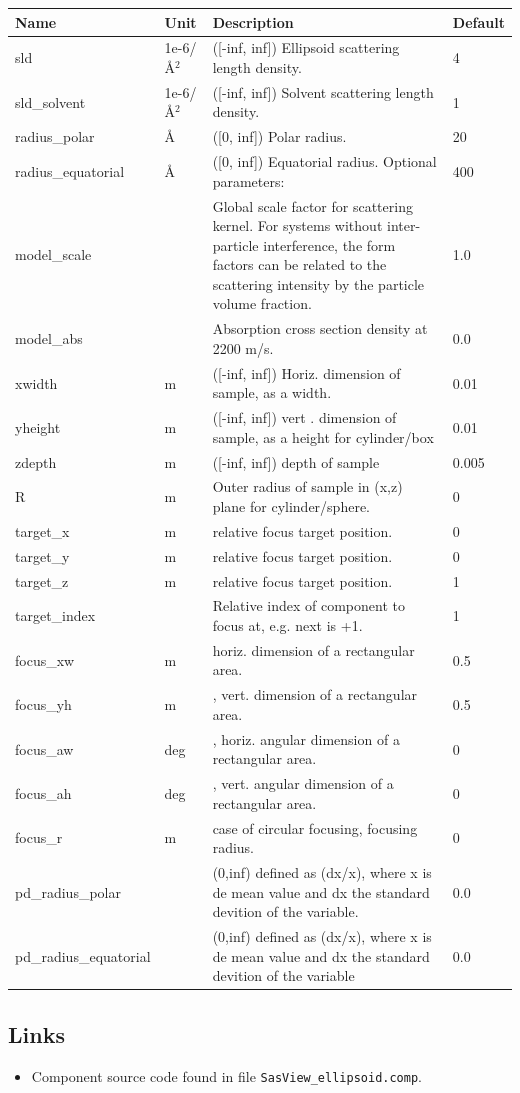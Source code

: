 \begin{longtable}{p{}p{}p{}p{}}
\toprule
\textbf{Name} & \textbf{Unit} & \textbf{Description} & \textbf{Default} \\
\midrule
\endhead
sld & 1e-6/\AA{}$^{2}$ & ([-inf, inf]) Ellipsoid scattering length density. & 4 \\
sld\_solvent & 1e-6/\AA{}$^{2}$ & ([-inf, inf]) Solvent scattering length density. & 1 \\
radius\_polar & \AA{} & ([0, inf]) Polar radius. & 20 \\
radius\_equatorial & \AA{} & ([0, inf]) Equatorial radius. Optional parameters: & 400 \\
model\_scale &   & Global scale factor for scattering kernel. For systems without inter-particle interference, the form factors can be related to the scattering intensity by the particle volume fraction. & 1.0 \\
model\_abs &   & Absorption cross section density at 2200 m/s. & 0.0 \\
xwidth & m & ([-inf, inf]) Horiz. dimension of sample, as a width. & 0.01 \\
yheight & m & ([-inf, inf]) vert . dimension of sample, as a height for cylinder/box & 0.01 \\
zdepth & m & ([-inf, inf]) depth of sample & 0.005 \\
R & m & Outer radius of sample in (x,z) plane for cylinder/sphere. & 0 \\
target\_x & m & relative focus target position. & 0 \\
target\_y & m & relative focus target position. & 0 \\
target\_z & m & relative focus target position. & 1 \\
target\_index &   & Relative index of component to focus at, e.g. next is +1. & 1 \\
focus\_xw & m & horiz. dimension of a rectangular area. & 0.5 \\
focus\_yh & m & , vert. dimension of a rectangular area. & 0.5 \\
focus\_aw & deg & , horiz. angular dimension of a rectangular area. & 0 \\
focus\_ah & deg & , vert. angular dimension of a rectangular area. & 0 \\
focus\_r & m & case of circular focusing, focusing radius. & 0 \\
pd\_radius\_polar &  & (0,inf) defined as (dx/x), where x is de mean value and dx the standard devition of the variable. & 0.0 \\
pd\_radius\_equatorial &  & (0,inf) defined as (dx/x), where x is de mean value and dx the standard devition of the variable & 0.0 \\
\bottomrule
\end{longtable}

\subsection*{Links}
\begin{itemize}
  \item Component source code found in file \texttt{SasView\_ellipsoid.comp}.
\end{itemize}
